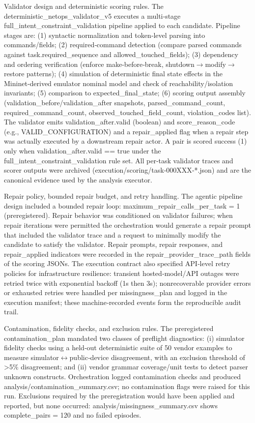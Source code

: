 \documentclass[conference]{IEEEtran}
\begin{document}
Validator design and deterministic scoring rules. The deterministic\_netops\_validator\_v5 executes a multi‑stage full\_intent\_constraint\_validation pipeline applied to each candidate. Pipeline stages are: (1) syntactic normalization and token‑level parsing into commands/fields; (2) required‑command detection (compare parsed commands against task.required\_sequence and allowed\_touched\_fields); (3) dependency and ordering verification (enforce make‑before‑break, shutdown\ensuremath{\rightarrow}modify\ensuremath{\rightarrow}restore patterns); (4) simulation of deterministic final state effects in the Mininet‑derived emulator nominal model and check of reachability/isolation invariants; (5) comparison to expected\_final\_state; (6) scoring output assembly (validation\_before/validation\_after snapshots, parsed\_command\_count, required\_command\_count, observed\_touched\_field\_count, violation\_codes list). The validator emits validation\_after.valid (boolean) and score\_reason\_code (e.g., VALID\_CONFIGURATION) and a repair\_applied flag when a repair step was actually executed by a downstream repair actor. A pair is scored success (1) only when validation\_after.valid == true under the full\_intent\_constraint\_validation rule set. All per‑task validator traces and scorer outputs were archived (execution/scoring/task‑000XXX‑*.json) and are the canonical evidence used by the analysis executor.

Repair policy, bounded repair budget, and retry handling. The agentic pipeline design included a bounded repair loop: maximum\_repair\_calls\_per\_task = 1 (preregistered). Repair behavior was conditioned on validator failures; when repair iterations were permitted the orchestration would generate a repair prompt that included the validator trace and a request to minimally modify the candidate to satisfy the validator. Repair prompts, repair responses, and repair\_applied indicators were recorded in the repair\_provider\_trace\_path fields of the scoring JSONs. The execution contract also specified API‑level retry policies for infrastructure resilience: transient hosted‑model/API outages were retried twice with exponential backoff (1s then 3s); nonrecoverable provider errors or exhausted retries were handled per missingness\_plan and logged in the execution manifest; these machine‑recorded events form the reproducible audit trail.

Contamination, fidelity checks, and exclusion rules. The preregistered contamination\_plan mandated two classes of preflight diagnostics: (i) simulator fidelity checks using a held‑out deterministic suite of 50 vendor examples to measure simulator\ensuremath{\leftrightarrow}public‑device disagreement, with an exclusion threshold of >5\% disagreement; and (ii) vendor grammar coverage/unit tests to detect parser unknown constructs. Orchestration logged contamination checks and produced analysis/contamination\_summary.csv; no contamination flags were raised for this run. Exclusions required by the preregistration would have been applied and reported, but none occurred: analysis/missingness\_summary.csv shows complete\_pairs = 120 and no failed episodes.
\end{document}
